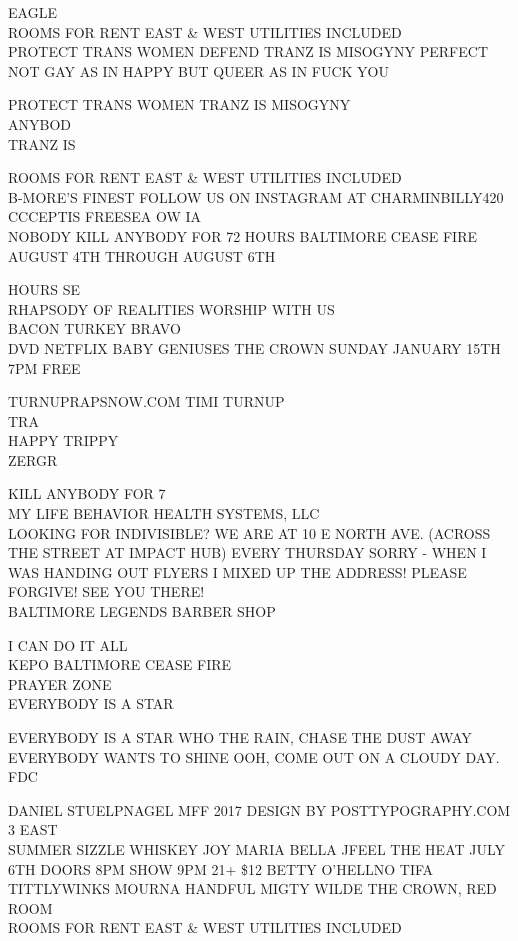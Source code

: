 \documentclass[10pt,letterpaper]{article}
\begin{document}
EAGLE\\
ROOMS FOR RENT EAST \& WEST UTILITIES INCLUDED\\
PROTECT TRANS WOMEN DEFEND TRANZ IS MISOGYNY PERFECT\\
NOT GAY AS IN HAPPY BUT QUEER AS IN FUCK YOU

PROTECT TRANS WOMEN TRANZ IS MISOGYNY\\
ANYBOD\\
TRANZ IS

ROOMS FOR RENT EAST \& WEST UTILITIES INCLUDED\\
B{-}MORE'S FINEST FOLLOW US ON INSTAGRAM AT CHARMINBILLY420\\
CCCEPTIS FREESEA OW IA\\
NOBODY KILL ANYBODY FOR 72 HOURS BALTIMORE CEASE FIRE AUGUST 4TH THROUGH AUGUST 6TH

HOURS SE\\
RHAPSODY OF REALITIES WORSHIP WITH US\\
BACON TURKEY BRAVO\\
DVD NETFLIX BABY GENIUSES THE CROWN SUNDAY JANUARY 15TH 7PM FREE

TURNUPRAPSNOW.COM TIMI TURNUP\\
TRA\\
HAPPY TRIPPY\\
ZERGR

KILL ANYBODY FOR 7\\
MY LIFE BEHAVIOR HEALTH SYSTEMS, LLC\\
LOOKING FOR INDIVISIBLE?  WE ARE AT 10 E NORTH AVE. (ACROSS THE STREET AT IMPACT HUB) EVERY THURSDAY SORRY  {-} WHEN I WAS HANDING OUT FLYERS I MIXED UP THE ADDRESS!  PLEASE FORGIVE!  SEE YOU THERE!\\
BALTIMORE LEGENDS BARBER SHOP

I CAN DO IT ALL\\
KEPO BALTIMORE CEASE FIRE\\
PRAYER ZONE\\
EVERYBODY IS A STAR

EVERYBODY IS A STAR WHO THE RAIN, CHASE THE DUST AWAY EVERYBODY WANTS TO SHINE OOH, COME OUT ON A CLOUDY DAY.\\
FDC

DANIEL STUELPNAGEL MFF 2017 DESIGN BY POSTTYPOGRAPHY.COM\\
3 EAST\\
SUMMER SIZZLE WHISKEY JOY MARIA BELLA JFEEL THE HEAT JULY 6TH DOORS 8PM SHOW 9PM 21+ \$12 BETTY O'HELLNO TIFA TITTLYWINKS MOURNA HANDFUL MIGTY WILDE THE CROWN, RED ROOM\\
ROOMS FOR RENT EAST \& WEST UTILITIES INCLUDED
\end{document}
